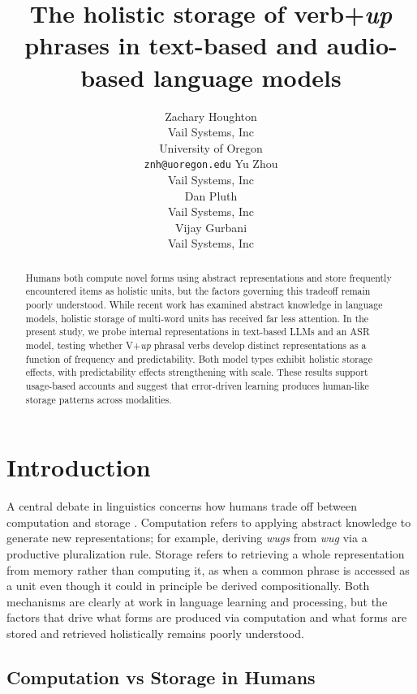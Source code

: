 \documentclass[11pt]{article}
\date{}
\title{The holistic storage of verb+\emph{up} phrases in text-based and
audio-based language models}
\author{
  Zachary Houghton \\
      Vail Systems, Inc \\ University of Oregon \\
        \texttt{znh@uoregon.edu}
     \And
  Yu Zhou \\
      Vail Systems, Inc \\
       \And
  Dan Pluth \\
      Vail Systems, Inc \\
       \And
  Vijay Gurbani \\
      Vail Systems, Inc \\
      }
\begin{document}
\maketitle

\begin{abstract}
Humans both compute novel forms using abstract representations and store
frequently encountered items as holistic units, but the factors
governing this tradeoff remain poorly understood. While recent work has
examined abstract knowledge in language models, holistic storage of
multi-word units has received far less attention. In the present study,
we probe internal representations in text-based LLMs and an ASR model,
testing whether V+\emph{up} phrasal verbs develop distinct
representations as a function of frequency and predictability. Both
model types exhibit holistic storage effects, with predictability
effects strengthening with scale. These results support usage-based
accounts and suggest that error-driven learning produces human-like
storage patterns across modalities.
\end{abstract}

\section{Introduction}\label{introduction}

A central debate in linguistics concerns how humans trade off between
computation and storage
\citep{stembergerAreInflectedForms2004, stembergerFrequencyLexicalStorage1986, kapatsinski2010frequencyuseleads, houghton2023doespredictabilitydrive, houghton2024frequencydependentpreferenceextremity, houghton2025boltsnutslanguage, houghton2025multiwordrepresentationsminds, morgan2016abstractknowledgedirect, morgan2024productiveknowledgeitemspecific, morganModelingIdiosyncraticPreferences2015}.
Computation refers to applying abstract knowledge to generate new
representations; for example, deriving \emph{wugs} from \emph{wug} via a
productive pluralization rule. Storage refers to retrieving a whole
representation from memory rather than computing it, as when a common
phrase is accessed as a unit even though it could in principle be
derived compositionally. Both mechanisms are clearly at work in language
learning and processing, but the factors that drive what forms are
produced via computation and what forms are stored and retrieved
holistically remains poorly understood.

\subsection{Computation vs Storage in
Humans}\label{computation-vs-storage-in-humans}
\end{document}
